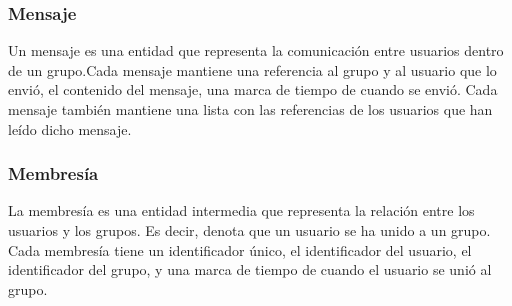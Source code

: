 \subsubsection{Mensaje}
Un mensaje es una entidad que representa la comunicación entre usuarios dentro de un grupo.Cada mensaje mantiene una referencia al grupo y al usuario que lo envió, el contenido del mensaje, una marca de tiempo de cuando se envió. Cada mensaje también mantiene una lista con las referencias de los usuarios que han leído dicho mensaje.

\subsubsection{Membresía}
La membresía es una entidad intermedia que representa la relación entre los usuarios y los grupos. Es decir, denota que un usuario se ha unido a un grupo. Cada membresía tiene un identificador único, el identificador del usuario, el identificador del grupo, y una marca de tiempo de cuando el usuario se unió al grupo.

